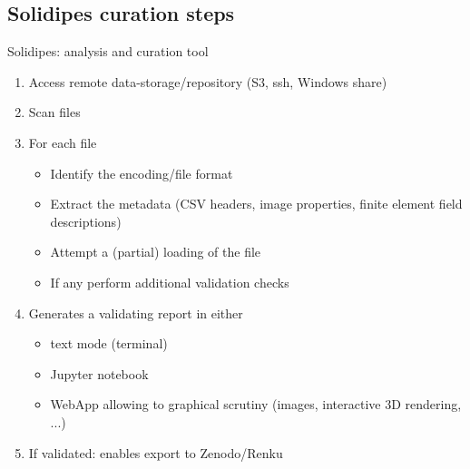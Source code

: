 \documentclass[10pt,compress,serif,aspectratio=169]{beamer}
\begin{document}
\subsection{Solidipes curation steps}
\begin{frame}{ Solidipes: analysis and curation tool}

\begin{enumerate}
  \item Access remote data-storage/repository (S3, ssh, Windows share)
\pause
  \item Scan files
\pause
  \item For each file
 \begin{itemize}
   \item Identify the encoding/file format
   \item Extract the metadata (CSV headers, image properties, finite element field descriptions)
   \item Attempt a (partial) loading of the file
   \item If any perform additional validation checks
 \end{itemize}
\pause
\item Generates a validating report in either
 \begin{itemize}
   \item text mode (terminal)
   \item Jupyter notebook
   \item WebApp allowing to graphical scrutiny (images, interactive 3D rendering, ...)
\end{itemize}
\pause
\item If validated: enables export to Zenodo/Renku
 \end{enumerate}
\end{frame}


\end{document}
